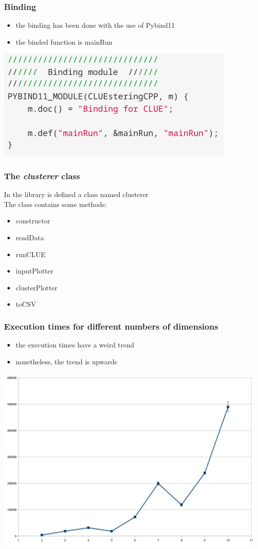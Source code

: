 \documentclass{beamer}
\begin{document}
\begin{frame}
\frametitle{Binding}
\begin{itemize}
	\item the binding has been done with the use of Pybind11
	\item the binded function is mainRun
\end{itemize}
\begin{center}
	\includegraphics[scale=0.7]{binding.png}
\end{center}
\end{frame}
\begin{frame}
\frametitle{The \textit{clusterer} class}
In the library is defined a class named clusterer \\
The class contains some methods:
\begin{itemize}
	\item constructor	
	\item readData
	\item runCLUE
	\item inputPlotter 
	\item clusterPlotter 
	\item toCSV
\end{itemize}
\end{frame}
\begin{frame}
\frametitle{Execution times for different numbers of dimensions}
\begin{itemize}
	\item the execution times have a weird trend	
	\item nonetheless, the trend is upwards
\end{itemize}
\begin{center}
	\includegraphics[scale=0.3]{Time_Scaling.jpg}
\end{center}
\end{frame}
\end{document}
